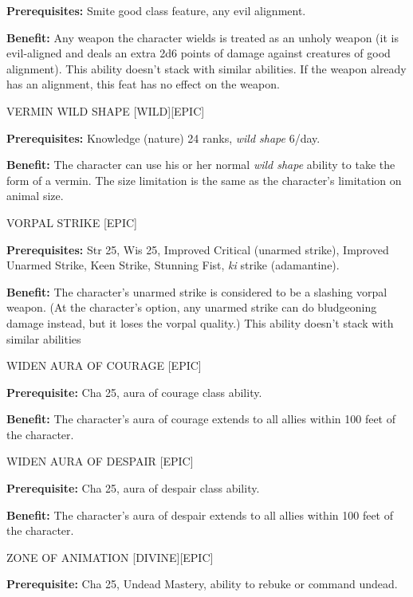 \documentclass{article}
\begin{document}
\textbf{Prerequisites:} Smite good class feature, any evil alignment. 

\textbf{Benefit:} Any weapon the character wields is treated as an unholy weapon 
(it is evil-aligned and deals an extra 2d6 points of damage against creatures of 
good alignment). This ability doesn't stack with similar abilities. If the weapon 
already has an alignment, this feat has no effect on the weapon.

\vspace{12pt}
VERMIN WILD SHAPE [WILD][EPIC] 

\textbf{Prerequisites:} Knowledge (nature) 24 ranks, \textit{wild shape }6/day. 

\textbf{Benefit:} The character can use his or her normal \textit{wild shape }ability 
to take the form of a vermin. The size limitation is the same as the character's 
limitation on animal size. 

\vspace{12pt}
VORPAL STRIKE [EPIC] 

\textbf{Prerequisites:} Str 25, Wis 25, Improved Critical (unarmed strike), Improved 
Unarmed Strike, Keen Strike, Stunning Fist, \textit{ki }strike (adamantine). 

\textbf{Benefit:} The character's unarmed strike is considered to be a slashing 
vorpal weapon. (At the character's option, any unarmed strike can do bludgeoning 
damage instead, but it loses the vorpal quality.) This ability doesn't stack with 
similar abilities

\vspace{12pt}
WIDEN AURA OF COURAGE [EPIC]

\textbf{Prerequisite:} Cha 25, aura of courage class ability. 

\textbf{Benefit:} The character's aura of courage extends to all allies within 
100 feet of the character. 

\vspace{12pt}
WIDEN AURA OF DESPAIR [EPIC] 

\textbf{Prerequisite:} Cha 25, aura of despair class ability. 

\textbf{Benefit:} The character's aura of despair extends to all allies within 
100 feet of the character. 

\vspace{12pt}
ZONE OF ANIMATION [DIVINE][EPIC]

\textbf{Prerequisite:} Cha 25, Undead Mastery, ability to rebuke or command undead. 
\end{document}
